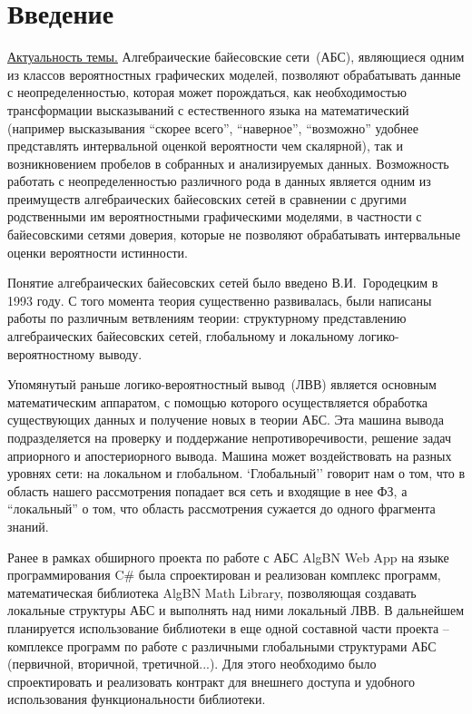 \section*{Введение}

\underline{Актуальность темы.} Алгебраические байесовские сети~(АБС), являющиеся одним из классов вероятностных графических моделей, позволяют обрабатывать данные с неопределенностью, которая может порождаться, как необходимостью трансформации высказываний с естественного языка на математический (например высказывания ``скорее всего'', ``наверное'', ``возможно'' удобнее представлять интервальной оценкой вероятности чем скалярной), так и возникновением пробелов в собранных и анализируемых данных. Возможность работать с неопределенностью различного рода в данных является одним из преимуществ алгебраических байесовских сетей в сравнении с другими родственными им вероятностными графическими моделями, в частности с байесовскими сетями доверия, которые не позволяют обрабатывать интервальные оценки вероятности истинности.
   
   Понятие алгебраических байесовских сетей было введено В.И.~Городецким в 1993 году. С того момента теория существенно развивалась, были написаны работы по различным ветвлениям теории: структурному представлению алгебраических байесовских сетей, глобальному и локальному логико-вероятностному выводу.
   
   Упомянутый раньше логико-вероятностный вывод~(ЛВВ) является основным математическим аппаратом, с помощью которого осуществляется обработка существующих данных и получение новых в теории АБС. Эта машина вывода подразделяется на проверку и поддержание непротиворечивости, решение задач априорного и апостериорного вывода. Машина может воздействовать на разных уровнях сети: на локальном и глобальном. `Глобальный'' говорит нам о том, что в область нашего рассмотрения попадает вся сеть и входящие в нее ФЗ, а ``локальный'' о том, что область рассмотрения сужается до одного фрагмента знаний.
        
     Ранее в рамках обширного проекта по работе с АБС AlgBN Web App на языке программирования C\# была спроектирован и реализован комплекс программ, математическая библиотека AlgBN Math Library, позволяющая создавать локальные структуры АБС и выполнять над ними локальный ЛВВ. В дальнейшем планируется использование библиотеки в еще одной составной части проекта -- комплексе программ по работе с различными глобальными структурами АБС (первичной, вторичной, третичной...). Для этого необходимо было спроектировать и реализовать контракт для внешнего доступа и удобного использования функциональности библиотеки.  
     
